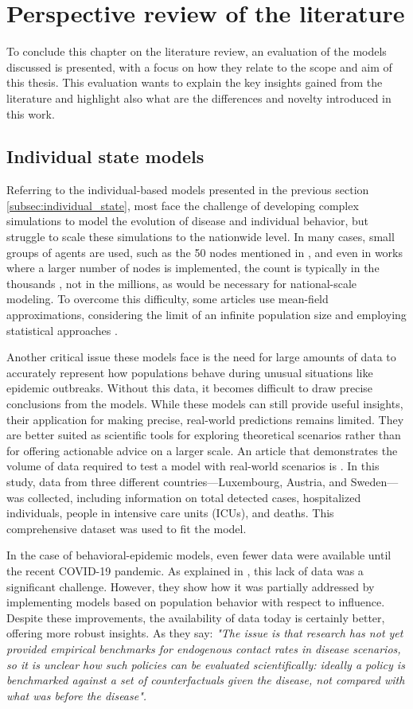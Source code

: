 \section{Perspective review of the literature}
To conclude this chapter on the literature review, an evaluation of the models discussed is presented, with a focus on how they relate to the scope and aim of this thesis. This evaluation wants to explain the key insights gained from the literature and highlight also what are the differences and novelty introduced in this work.

\subsection{Individual state models}
Referring to the individual-based models presented in the previous section \ref{subsec:individual_state}, most face the challenge of developing complex simulations to model the evolution of disease and individual behavior, but struggle to scale these simulations to the nationwide level. In many cases, small groups of agents are used, such as the 50 nodes mentioned in \cite{Nunner2021}, and even in works where a larger number of nodes is implemented, the count is typically in the thousands \cite{Granell2013}, not in the millions, as would be necessary for national-scale modeling. To overcome this difficulty, some articles use mean-field approximations, considering the limit of an infinite population size and employing statistical approaches \cite{Frieswijk_2022}.

Another critical issue these models face is the need for large amounts of data to accurately represent how populations behave during unusual situations like epidemic outbreaks. Without this data, it becomes difficult to draw precise conclusions from the models. While these models can still provide useful insights, their application for making precise, real-world predictions remains limited. They are better suited as scientific tools for exploring theoretical scenarios rather than for offering actionable advice on a larger scale. An article that demonstrates the volume of data required to test a model with real-world scenarios is \cite{Kemp_2021}. In this study, data from three different countries—Luxembourg, Austria, and Sweden—was collected, including information on total detected cases, hospitalized individuals, people in intensive care units (ICUs), and deaths. This comprehensive dataset was used to fit the model.

In the case of behavioral-epidemic models, even fewer data were available until the recent COVID-19 pandemic. As explained in \cite{Gosak2021}, this lack of data was a significant challenge. However, they show how it was partially addressed by implementing models based on population behavior with respect to influence. Despite these improvements, the availability of data today is certainly better, offering more robust insights. As they say: \textit{"The issue is that research has not yet provided empirical benchmarks for endogenous contact rates in disease scenarios, so it is unclear how such policies can be evaluated scientifically: ideally a policy is benchmarked against a set of counterfactuals given the disease, not compared with what was before the disease".}

